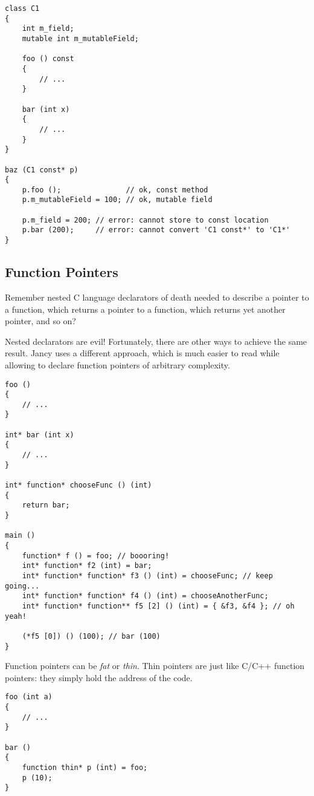 \documentclass[oneside]{book}
\begin{document}
\begin{lstlisting}
class C1
{
    int m_field;
    mutable int m_mutableField;

    foo () const
    {
        // ...
    }

    bar (int x)
    {
        // ...
    }   
}

baz (C1 const* p)
{
    p.foo ();               // ok, const method
    p.m_mutableField = 100; // ok, mutable field

    p.m_field = 200; // error: cannot store to const location
    p.bar (200);     // error: cannot convert 'C1 const*' to 'C1*'
}
\end{lstlisting}

\subsection{Function Pointers}

Remember nested C language declarators of death needed to describe a pointer to a function, which returns a pointer to a function, which returns yet another pointer, and so on?

Nested declarators are evil! Fortunately, there are other ways to achieve the same result. Jancy uses a different approach, which is much easier to read while allowing to declare function pointers of arbitrary complexity.

\begin{lstlisting}
foo ()
{
    // ...
}

int* bar (int x)
{
    // ...
}

int* function* chooseFunc () (int)
{
    return bar;
}

main ()
{
    function* f () = foo; // boooring!
    int* function* f2 (int) = bar; 
    int* function* function* f3 () (int) = chooseFunc; // keep going...
    int* function* function* f4 () (int) = chooseAnotherFunc; 
    int* function* function** f5 [2] () (int) = { &f3, &f4 }; // oh yeah!

    (*f5 [0]) () (100); // bar (100)
}
\end{lstlisting}

Function pointers can be \emph{fat} or \emph{thin}. Thin pointers are just like C/C++ function pointers: they simply hold the address of the code.

\begin{lstlisting}
foo (int a)
{
    // ...
}

bar ()
{
    function thin* p (int) = foo;
    p (10);
}
\end{lstlisting}
\end{document}
